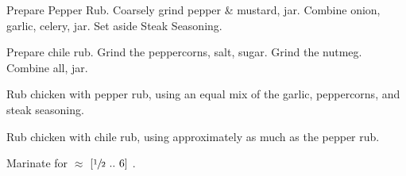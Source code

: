 \begin{preparation}
\item Prepare Pepper Rub.
	Coarsely grind pepper \& mustard, jar.
	Combine onion, garlic, celery, jar.
	Set aside Steak Seasoning.
\item Prepare chile rub.
	Grind the peppercorns, salt, sugar.
	Grind the nutmeg.
	Combine all, jar.
\item Rub chicken with pepper rub,
	using an equal mix of the garlic, peppercorns, and steak seasoning.
\item Rub chicken with chile rub,
	using approximately as much as the pepper rub.
\item Marinate for $\approx$ $[\sfrac{1}{2}~..~6]$ \hour.
\end{preparation}


\recipeend%
